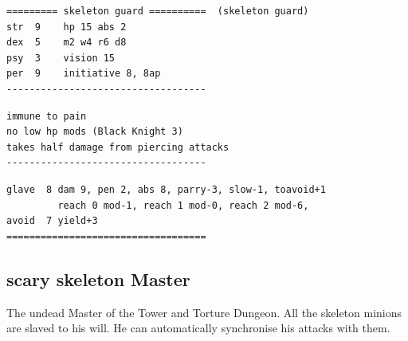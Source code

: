 \small \begin{samepage} \begin{verbatim}
========= skeleton guard ==========  (skeleton guard)
str  9    hp 15 abs 2
dex  5    m2 w4 r6 d8
psy  3    vision 15
per  9    initiative 8, 8ap
-----------------------------------
\end{verbatim} \end{samepage} \goodbreak \begin{samepage} \begin{verbatim}
immune to pain
no low hp mods (Black Knight 3)
takes half damage from piercing attacks
-----------------------------------
\end{verbatim} \end{samepage} \goodbreak \begin{samepage} \begin{verbatim}
glave  8 dam 9, pen 2, abs 8, parry-3, slow-1, toavoid+1
         reach 0 mod-1, reach 1 mod-0, reach 2 mod-6,
avoid  7 yield+3
===================================
\end{verbatim} \end{samepage} \normalsize


\goodbreak
\subsection*{scary skeleton Master}
\label{skeletonmaster}

The undead Master of the Tower and Torture Dungeon. All the skeleton minions are slaved to his will. He can automatically synchronise his attacks with them.

\


